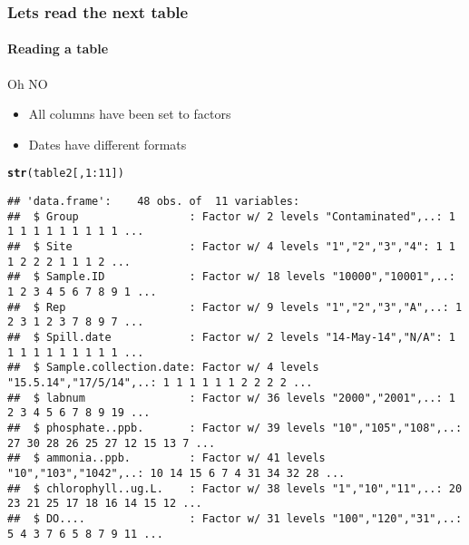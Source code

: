\documentclass[12pt]{beamer}\usepackage[]{graphicx}\usepackage[]{color}
\makeatletter
\newcommand{\hlnum}[1]{\textcolor[rgb]{0.686,0.059,0.569}{#1}}%
\newcommand{\hlopt}[1]{\textcolor[rgb]{0,0,0}{#1}}%
\newcommand{\hlstd}[1]{\textcolor[rgb]{0.345,0.345,0.345}{#1}}%
\newcommand{\hlkwd}[1]{\textcolor[rgb]{0.737,0.353,0.396}{\textbf{#1}}}%
\newenvironment{kframe}{%
 \def\at@end@of@kframe{}%
 \ifinner\ifhmode%
  \def\at@end@of@kframe{\end{minipage}}%
  \begin{minipage}{\columnwidth}%
 \fi\fi%
 \def\FrameCommand##1{\hskip\@totalleftmargin \hskip-\fboxsep
 \colorbox{shadecolor}{##1}\hskip-\fboxsep
     \hskip-\linewidth \hskip-\@totalleftmargin \hskip\columnwidth}%
 \MakeFramed {\advance\hsize-\width
   \@totalleftmargin\z@ \linewidth\hsize
   \@setminipage}}%
 {\par\unskip\endMakeFramed%
 \at@end@of@kframe}
\newenvironment{knitrout}{}{} %
\makeatother
\begin{document}
\begin{frame}[fragile]
  \frametitle{Lets read the next table}
  \framesubtitle{Reading a table}
  \begin{alert}{Oh NO}
\begin{itemize}  
\item All columns have been set to factors
\item Dates have different formats
\end{itemize}
\end{alert}
\begin{knitrout}
\color{fgcolor}\begin{kframe}
\begin{alltt}
\hlkwd{str}\hlstd{(table2[,}\hlnum{1}\hlopt{:}\hlnum{11}\hlstd{])}
\end{alltt}
\begin{verbatim}
## 'data.frame':	48 obs. of  11 variables:
##  $ Group                 : Factor w/ 2 levels "Contaminated",..: 1 1 1 1 1 1 1 1 1 1 ...
##  $ Site                  : Factor w/ 4 levels "1","2","3","4": 1 1 1 2 2 2 1 1 1 2 ...
##  $ Sample.ID             : Factor w/ 18 levels "10000","10001",..: 1 2 3 4 5 6 7 8 9 1 ...
##  $ Rep                   : Factor w/ 9 levels "1","2","3","A",..: 1 2 3 1 2 3 7 8 9 7 ...
##  $ Spill.date            : Factor w/ 2 levels "14-May-14","N/A": 1 1 1 1 1 1 1 1 1 1 ...
##  $ Sample.collection.date: Factor w/ 4 levels "15.5.14","17/5/14",..: 1 1 1 1 1 1 2 2 2 2 ...
##  $ labnum                : Factor w/ 36 levels "2000","2001",..: 1 2 3 4 5 6 7 8 9 19 ...
##  $ phosphate..ppb.       : Factor w/ 39 levels "10","105","108",..: 27 30 28 26 25 27 12 15 13 7 ...
##  $ ammonia..ppb.         : Factor w/ 41 levels "10","103","1042",..: 10 14 15 6 7 4 31 34 32 28 ...
##  $ chlorophyll..ug.L.    : Factor w/ 38 levels "1","10","11",..: 20 23 21 25 17 18 16 14 15 12 ...
##  $ DO....                : Factor w/ 31 levels "100","120","31",..: 5 4 3 7 6 5 8 7 9 11 ...
\end{verbatim}
\end{kframe}
\end{knitrout}



\end{frame}
\end{document}
